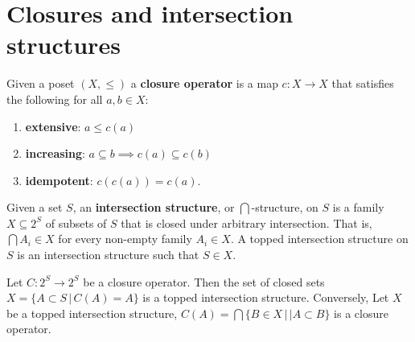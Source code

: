 \documentclass{article}
\begin{document}
\section{Closures and intersection structures}

\begin{defn}
	Given a poset $(X, \leq)$ a \textbf{closure operator} is a map $c : X \to X$ that satisfies the following for all $a,b \in X$:
	\begin{enumerate}
		\item \textbf{extensive}: $a \leq c(a)$
		\item \textbf{increasing}: $a \subseteq b \implies c(a) \subseteq c(b)$
		\item \textbf{idempotent}: $c(c(a)) = c(a)$.
	\end{enumerate}
\end{defn}

\begin{defn}
	Given a set $S$, an \textbf{intersection structure}, or $\bigcap$-structure, on $S$ is a family $X \subseteq 2^{S}$ of subsets of $S$ that is closed under arbitrary intersection. That is, $\bigcap A_i \in X$ for every non-empty family $A_i \in X$. A topped intersection structure on $S$ is an intersection structure such that $S \in X$.
\end{defn}

\begin{prop}
	Let $C : 2^{S} \to 2^{S}$ be a closure operator. Then the set of closed sets $X = \{ A \subset S \, | \, C(A) = A\}$ is a topped intersection structure. Conversely, Let $X$ be a topped intersection structure, $C(A) = \bigcap \{B \in X \, | \, | A \subset B \}$ is a closure operator.
\end{prop}




\end{document}
